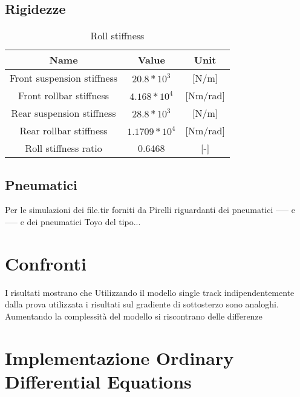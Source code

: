 \subsection{Rigidezze}
\begin{table}[H]
    \centering
    \caption{Roll stiffness}
    \vspace{0.5em}
    \begin{tabular}{ccc}
    \hline
        Name & Value & Unit \\
        \hline
        Front suspension stiffness & $20.8*10^3$ & [N/m]\\
        Front rollbar stiffness & $4.168*10^4$ & [Nm/rad]\\
        Rear suspension stiffness & $28.8*10^3$ & [N/m]\\
        Rear rollbar stiffness & $1.1709*10^4$ & [Nm/rad]\\
        Roll stiffness ratio & 0.6468 & [-]\\
    \hline    
    \end{tabular}
    \label{tab:tabella rigidezze}
\end{table}

\subsection{Pneumatici}
Per le simulazioni dei file.tir forniti da Pirelli riguardanti dei pneumatici ----- e -----
e dei pneumatici Toyo del tipo...

\section{Confronti}
I risultati mostrano che Utilizzando il modello single track
indipendentemente dalla prova utilizzata i risultati sul 
gradiente di sottosterzo sono analoghi.
Aumentando la complessità del modello si riscontrano delle differenze

\section{Implementazione Ordinary Differential Equations}
